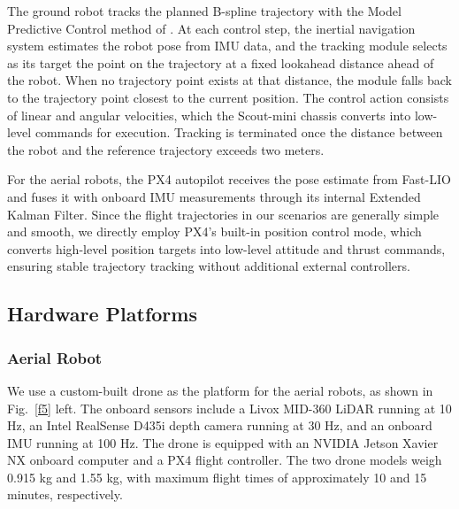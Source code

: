 The ground robot tracks the planned B-spline trajectory with the Model Predictive Control method of \cite{yang2022sms}. At each control step, the inertial navigation system estimates the robot pose from IMU data, and the tracking module selects as its target the point on the trajectory at a fixed lookahead distance ahead of the robot. When no trajectory point exists at that distance, the module falls back to the trajectory point closest to the current position. The control action consists of linear and angular velocities, which the Scout-mini chassis converts into low-level commands for execution. Tracking is terminated once the distance between the robot and the reference trajectory exceeds two meters.

For the aerial robots, the PX4 autopilot receives the pose estimate from Fast-LIO and fuses it with onboard IMU measurements through its internal Extended Kalman Filter. Since the flight trajectories in our scenarios are generally simple and smooth, we directly employ PX4's built-in position control mode, which converts high-level position targets into low-level attitude and thrust commands, ensuring stable trajectory tracking without additional external controllers.


\subsection{Hardware Platforms}

\subsubsection{Aerial Robot} We use a custom-built drone as the platform for the aerial robots, as shown in Fig.~\ref{f5} left. The onboard sensors include a Livox MID-360 LiDAR running at 10 Hz, an Intel RealSense D435i depth camera running at 30 Hz, and an onboard IMU running at 100 Hz. The drone is equipped with an NVIDIA Jetson Xavier NX onboard computer and a PX4 flight controller. The two drone models weigh 0.915 kg and 1.55 kg, with maximum flight times of approximately 10 and 15 minutes, respectively.


